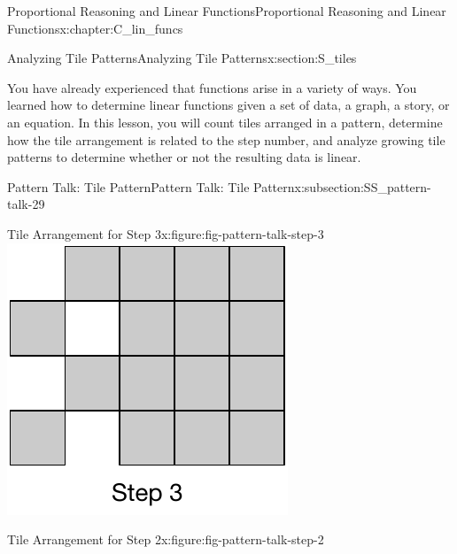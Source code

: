 \documentclass[oneside,10pt,]{book}
\numberwithin{equation}{chapter}
\begin{document}
\begin{chapterptx}{Proportional Reasoning and Linear Functions}{}{Proportional Reasoning and Linear Functions}{}{}{x:chapter:C_lin_funcs}
\begin{sectionptx}{Analyzing Tile Patterns}{}{Analyzing Tile Patterns}{}{}{x:section:S_tiles}
\begin{introduction}{}%
You have already experienced that functions arise in a variety of ways. You learned how to determine linear functions given a set of data, a graph, a story, or an equation. In this lesson, you will count tiles arranged in a pattern, determine how the tile arrangement is related to the step number, and analyze growing tile patterns to determine whether or not the resulting data is linear.%
\end{introduction}%
%
%
\typeout{************************************************}
\typeout{************************************************}
%
\begin{subsectionptx}{Pattern Talk: Tile Pattern}{}{Pattern Talk: Tile Pattern}{}{}{x:subsection:SS_pattern-talk-29}
\begin{sidebyside}{2}{0}{0}{0}%
\begin{sbspanel}{0.5}%
\begin{figureptx}{Tile Arrangement for Step 3}{x:figure:fig-pattern-talk-step-3}{}%
\includegraphics[width=\linewidth]{external/pattern-talk-step-3.pdf}
\tcblower
\end{figureptx}%
\end{sbspanel}%
\begin{sbspanel}{0.5}%
\begin{figureptx}{Tile Arrangement for Step 2}{x:figure:fig-pattern-talk-step-2}{}%

\end{figureptx}
\end{sbspanel}
\end{sidebyside}
\end{subsectionptx}
\end{sectionptx}
\end{chapterptx}
\end{document}
